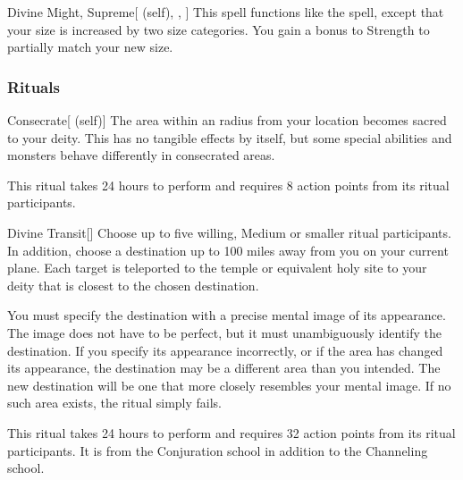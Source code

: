 \lowercase{\hypertarget{spell:Divine Might, Supreme}{}}\label{spell:Divine Might, Supreme}
\begin{attuneability}[\nth{7}]{\hypertarget{spell:Divine Might, Supreme}{Divine Might, Supreme}}[ (self), , ]
This spell functions like the  spell, except that your size is increased by two size categories.
You gain a  bonus to Strength to partially match your new size.
\end{attuneability}
\vspace{0.25em}



\subsubsection{Rituals}


\lowercase{\hypertarget{spell:Consecrate}{}}\label{spell:Consecrate}
\begin{attuneability}[\nth{2}]{\hypertarget{spell:Consecrate}{Consecrate}}[ (self)]
The area within an \arealarge radius  from your location becomes sacred to your deity.
This has no tangible effects by itself, but some special abilities and monsters behave differently in consecrated areas.

This ritual takes 24 hours to perform and requires 8 action points from its ritual participants.
\end{attuneability}
\vspace{0.25em}



\lowercase{\hypertarget{spell:Divine Transit}{}}\label{spell:Divine Transit}
\begin{apability}[\nth{4}]{\hypertarget{spell:Divine Transit}{Divine Transit}}[]
Choose up to five willing, Medium or smaller ritual participants.
In addition, choose a destination up to 100 miles away from you on your current plane.
Each target is teleported to the temple or equivalent holy site to your deity that is closest to the chosen destination.

You must specify the destination with a precise mental image of its appearance.
The image does not have to be perfect, but it must unambiguously identify the destination.
If you specify its appearance incorrectly, or if the area has changed its appearance, the destination may be a different area than you intended.
The new destination will be one that more closely resembles your mental image.
If no such area exists, the ritual simply fails.

This ritual takes 24 hours to perform and requires 32 action points from its ritual participants.
It is from the Conjuration school in addition to the Channeling school.
\end{apability}
\vspace{0.25em}


